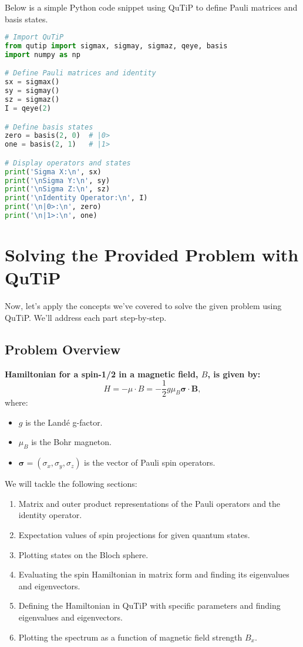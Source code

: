 \documentclass[12pt]{article}
\begin{document}
Below is a simple Python code snippet using QuTiP to define Pauli matrices and basis states.

\begin{lstlisting}[language=Python, caption=Defining Pauli Matrices and Basis States in QuTiP]
# Import QuTiP
from qutip import sigmax, sigmay, sigmaz, qeye, basis
import numpy as np

# Define Pauli matrices and identity
sx = sigmax()
sy = sigmay()
sz = sigmaz()
I = qeye(2)

# Define basis states
zero = basis(2, 0)  # |0>
one = basis(2, 1)   # |1>

# Display operators and states
print('Sigma X:\n', sx)
print('\nSigma Y:\n', sy)
print('\nSigma Z:\n', sz)
print('\nIdentity Operator:\n', I)
print('\n|0>:\n', zero)
print('\n|1>:\n', one)
\end{lstlisting}

\section{Solving the Provided Problem with QuTiP}

Now, let's apply the concepts we've covered to solve the given problem using QuTiP. We'll address each part step-by-step.

\subsection{Problem Overview}

\textbf{Hamiltonian for a spin-1/2 in a magnetic field, \( B \), is given by:}
\[
H = -\mu \cdot B = -\frac{1}{2} g \mu_B \bm{\sigma} \cdot \bm{B},
\]
where:
\begin{itemize}
    \item \( g \) is the Landé g-factor.
    \item \( \mu_B \) is the Bohr magneton.
    \item \( \bm{\sigma} = (\sigma_x, \sigma_y, \sigma_z) \) is the vector of Pauli spin operators.
\end{itemize}

We will tackle the following sections:
\begin{enumerate}
    \item Matrix and outer product representations of the Pauli operators and the identity operator.
    \item Expectation values of spin projections for given quantum states.
    \item Plotting states on the Bloch sphere.
    \item Evaluating the spin Hamiltonian in matrix form and finding its eigenvalues and eigenvectors.
    \item Defining the Hamiltonian in QuTiP with specific parameters and finding eigenvalues and eigenvectors.
    \item Plotting the spectrum as a function of magnetic field strength \( B_x \).
\end{enumerate}
\end{document}
